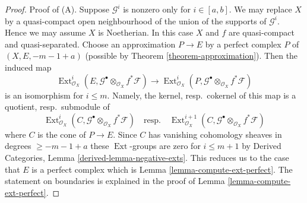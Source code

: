 \documentclass{stacks-project}
\theoremstyle{plain}
\theoremstyle{definition}
\theoremstyle{remark}
\numberwithin{equation}{subsection}
\def\Ext{\mathop{\mathrm{Ext}}\nolimits}
\begin{document}
\begin{proof}
Proof of (A).
Suppose $\mathcal{G}^i$ is nonzero only for $i \in [a, b]$.
We may replace $X$ by a quasi-compact open neighbourhood of
the union of the supports of $\mathcal{G}^i$.
Hence we may assume $X$ is Noetherian.
In this case $X$ and $f$ are quasi-compact and quasi-separated.
Choose an approximation $P \to E$ by a perfect complex $P$ of
$(X, E, -m - 1 + a)$
(possible by Theorem \ref{theorem-approximation}).
Then the induced map
$$
\Ext^i_{\mathcal{O}_X}(E,
\mathcal{G}^\bullet \otimes_{\mathcal{O}_X} f^*\mathcal{F})
\longrightarrow
\Ext^i_{\mathcal{O}_X}(P,
\mathcal{G}^\bullet \otimes_{\mathcal{O}_X} f^*\mathcal{F})
$$
is an isomorphism for $i \leq m$. Namely, the kernel, resp.\ cokernel of this
map is a quotient, resp.\ submodule of
$$
\Ext^i_{\mathcal{O}_X}(C,
\mathcal{G}^\bullet \otimes_{\mathcal{O}_X} f^*\mathcal{F})
\quad\text{resp.}\quad
\Ext^{i + 1}_{\mathcal{O}_X}(C,
\mathcal{G}^\bullet \otimes_{\mathcal{O}_X} f^*\mathcal{F})
$$
where $C$ is the cone of $P \to E$. Since $C$ has vanishing cohomology
sheaves in degrees $\geq -m - 1 + a$ these $\Ext$-groups are zero
for $i \leq m + 1$ by
Derived Categories, Lemma \ref{derived-lemma-negative-exts}.
This reduces us to the case that
$E$ is a perfect complex which is Lemma \ref{lemma-compute-ext-perfect}.
The statement on boundaries is explained in the proof of
Lemma \ref{lemma-compute-ext-perfect}.


\end{proof}
\end{document}
